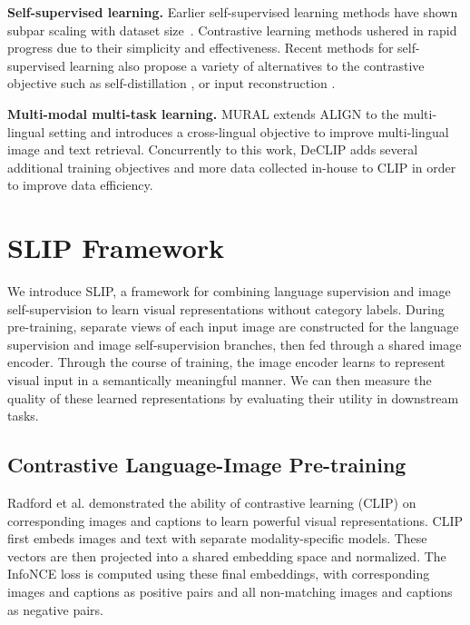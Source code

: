 \documentclass[10pt,twocolumn,letterpaper]{article}
\renewcommand{\paragraph}[1]{\vspace{1.25mm}\noindent\textbf{#1}}
\begin{document}
\paragraph{Self-supervised learning.}
Earlier self-supervised learning methods have shown subpar scaling with dataset size~\cite{Goyal2019ScalingAB}. Contrastive learning methods ushered in rapid progress \cite{Oord2018RepresentationLW,Wu2018UnsupervisedFL,He2020MomentumCF,Chen2020ASF} due to their simplicity and effectiveness. Recent methods for self-supervised learning also propose a variety of alternatives to the contrastive objective such as self-distillation \cite{Grill2020BootstrapYO,Caron2021EmergingPI}, or input reconstruction \cite{Bao2021BEiTBP,He2021MaskedAA}.

\paragraph{Multi-modal multi-task learning.}
MURAL \cite{Jain2021MURALMM} extends ALIGN to the multi-lingual setting and introduces a cross-lingual objective to improve multi-lingual image and text retrieval.
Concurrently to this work, DeCLIP \cite{Li2021SupervisionEE} adds several additional training objectives and more data collected in-house to CLIP in order to improve data efficiency.

\section{SLIP Framework}
\label{sec:slip}

We introduce SLIP, a framework for combining language supervision and image self-supervision to learn visual representations without category labels.
During pre-training, separate views of each input image are constructed for the language supervision and image self-supervision branches, then fed through a shared image encoder.
Through the course of training, the image encoder learns to represent visual input in a semantically meaningful manner.
We can then measure the quality of these learned representations by evaluating their utility in downstream tasks.

\subsection{Contrastive Language-Image Pre-training}

Radford et al. \cite{Radford2021LearningTV} demonstrated the ability of contrastive learning (CLIP) on corresponding images and captions to learn powerful visual representations.
CLIP first embeds images and text with separate modality-specific models.
These vectors are then projected into a shared embedding space and normalized.
The InfoNCE loss is computed using these final embeddings, with corresponding images and captions as positive pairs and all non-matching images and captions as negative pairs.
\end{document}

